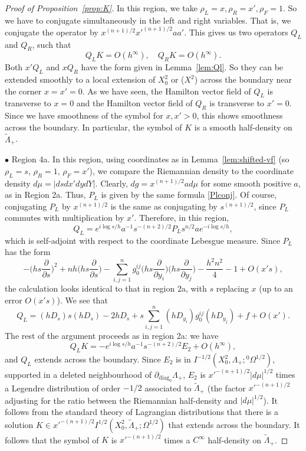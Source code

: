 \documentclass[10pt, a4paper, twoside]{amsart}
\numberwithin{equation}{section}
\theoremstyle{remark}
\begin{document}
\begin{proof}[Proof of Proposition~\ref{prop:K}]
In this region, we take $\rho_L = x, \rho_R = x', \rho_F = 1$. So we have to conjugate simultaneously in the left and right variables. That is, we conjugate the operator by $x^{(n+1)/2} {x'}^{(n+1)/2} a a'$. This gives us two operators $Q_L$ and $Q_R$, such that 
$$
Q_L K = O(h^\infty), \quad Q_R K = O(h^\infty).
$$
Both $x' Q_L$ and $x Q_R$ have the form given in Lemma~\ref{lem:Ql}. So they can be extended smoothly to a local extension of $X^2_0$ or ($X^2$) across the boundary near the corner $x = x' = 0$. As we have seen, the Hamilton vector field of $Q_L$ is transverse to $x=0$ and the Hamilton vector field of $Q_R$ is transverse to $x'=0$. Since we have smoothness of the symbol for $x, x' > 0$, this shows smoothness across the boundary. In particular, the symbol of $K$ is a smooth half-density on ${\tilde \Lambda}_+$.  

$\bullet$ Region 4a. In this region, using coordinates as in Lemma~\ref{lem:shifted-vf} (so $\rho_L = s$, $\rho_R = 1$, $\rho_F = x'$),  we compare the Riemannian density to the coordinate density $d\mu = |ds dx' dy dY|$. Clearly, $dg = x^{(n+1)/2} a d\mu$ for some smooth positive $a$, as in Region 2a. Thus, $P_L$ is given by the same formula \eqref{Plconj}. Of course, conjugating $P_L$ by $x^{(n+1)/2}$ is the same as conjugating by $s^{(n+1)/2}$, since $P_L$ commutes with multiplication by $x'$. Therefore, in this region, 
$$
Q_L = e^{i\log s/h} a^{-1} s^{-(n+2)/2} P_L s^{n/2} a e^{-i\log s/h},
$$
which is self-adjoint with respect to the coordinate Lebesgue measure. Since $P_L$ has the form 
\begin{equation}
- \bigg(hs \frac{\partial}{\partial s}\bigg)^2 +  n h \bigg(hs \frac{\partial}{\partial s}\bigg) - \sum_{i, j = 1}^n g_0^{i j}\bigg(h s \frac{\partial}{\partial y_i}\bigg)\bigg(h s \frac{\partial}{\partial y_j}\bigg)  - \frac{h^2 n^2}{4} - 1 + O(x's),
\label{Pl2a-4}\end{equation}
the calculation looks identical to that in region 2a, with $s$ replacing $x$ (up to an error $O(x's)$). We see that 
\begin{equation}
Q_L = 
 (hD_s) s (hD_s) - 2 h D_s + 
 s\sum_{i, j = 1}^n (h  D_{y_i}) g_0^{ij} (h  D_{y_j})  + f + O(x'). 
\label{Ql-4a}\end{equation}
The rest of the argument proceeds as in region 2a: we have 
$$
Q_L K = - e^{i\log s/h} a^{-1} s^{-(n+2)/2} E_2 + O(h^\infty),
$$
and $Q_L$ extends across the boundary. Since $E_2$ is in $I^{-1/2}(X^2_0, \Lambda_+; {{}^0\Omega^{1/2}})$, supported in a deleted neighbourhood of $\partial_{\mathrm{diag}_0} \Lambda_+$, $E_2$ is ${x'}^{-(n+1)/2} |d\mu|^{1/2}$ times a Legendre distribution of order $-1/2$ associated to ${\tilde \Lambda}_+$ (the factor ${x'}^{-(n+1)/2}$ adjusting for the ratio between the Riemannian half-density and $|d\mu|^{1/2}$). It follows from the standard theory of Lagrangian distributions that  there is a solution $K \in {x'}^{-(n+1)/2} I^{1/2}(X^2_0, {\tilde \Lambda}_+; \Omega^{1/2})$ that extends across the boundary. It follows that the symbol of $K$ is ${x'}^{-(n+1)/2}$ times a $C^\infty$ half-density on ${\tilde \Lambda}_+$. 


\end{proof}
\end{document}
